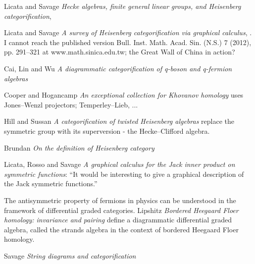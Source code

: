 \begin{description}
Licata and Savage {\em Hecke algebras, finite general linear
groups, and {Heisenberg } categorification}, 

Licata and Savage {\em A survey of {Heisenberg}
categorification via graphical calculus},
. I cannot reach the published version
Bull. Inst. Math. Acad. Sin. (N.S.) 7 (2012), pp. 291--321
at  {www.math.sinica.edu.tw};
the Great Wall of China in action?

Cai, Lin and Wu
{\em A diagrammatic categorification of q-boson and q-fermion algebras}

Cooper and Hogancamp
{\em An exceptional collection for {Khovanov} homology} uses
Jones–Wenzl projectors; Temperley–Lieb, ...

Hill and Sussan {\em A categorification of twisted
{Heisenberg} algebras}
replace the symmetric group with its superversion - the Hecke–Clifford
algebra.


Brundan {\em On the definition of {Heisenberg} category}

Licata, Rosso and Savage {\em A graphical calculus for the
{Jack} inner product on symmetric functions}: ``It would be interesting to
give a graphical description of the Jack symmetric functions.''

The antisymmetric property of fermions in physics can be understood in
the framework of differential graded categories.
Lipshitz \etal{} {\em Bordered Heegaard Floer homology:
invariance and pairing} define a diagrammatic differential graded
algebra, called the strands algebra in the context of bordered Heegaard
Floer homology.

Savage {\em String diagrams and categorification}


\end{description}

\Remarks

